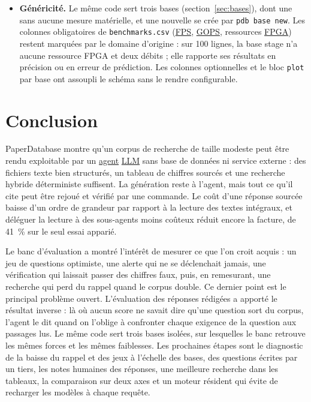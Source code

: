 \documentclass[11pt,a4paper]{article}
\newcommand{\cmd}[1]{\texttt{#1}}
\newcommand{\gl}[2]{\hyperlink{gl:#1}{\textcolor{glcolor}{#2}}}
\begin{document}
\begin{itemize}
    le moteur GPU, qui recharge ses modèles à chaque requête (3 à 4\,s).
  \item \textbf{Généricité.} Le même code sert trois bases (section~\ref{sec:bases}), dont une
    sans aucune mesure matérielle, et une nouvelle se crée par \cmd{pdb base new}. Les
    colonnes obligatoires de \cmd{benchmarks.csv} (\gl{FPS}{FPS}, \gl{GOPS}{GOPS}, ressources \gl{FPGA}{FPGA}) restent
    marquées par le domaine d'origine : sur 100 lignes, la base stage n'a aucune ressource FPGA et
    deux débits ; elle rapporte ses résultats en précision ou en erreur de prédiction. Les colonnes optionnelles et le bloc
    \cmd{plot} par base ont assoupli le schéma sans le rendre configurable.
\end{itemize}

\section{Conclusion}

PaperDatabase montre qu'un corpus de recherche de taille modeste peut être rendu
exploitable par un \gl{agent}{agent} \gl{LLM}{LLM} sans base de données ni service externe : des fichiers texte
bien structurés, un tableau de chiffres sourcés et une recherche hybride déterministe
suffisent. La génération reste à l'agent, mais tout ce qu'il cite peut être rejoué et
vérifié par une commande. Le coût d'une réponse sourcée baisse d'un ordre de grandeur par
rapport à la lecture des textes intégraux, et déléguer la lecture à des sous-agents moins
coûteux réduit encore la facture, de 41~\% sur le seul essai apparié.

Le banc d'évaluation a montré l'intérêt de mesurer ce que l'on croit acquis : un jeu de
questions optimiste, une alerte qui ne se déclenchait jamais, une vérification qui laissait
passer des chiffres faux, puis, en remesurant, une recherche qui perd du rappel quand le
corpus double. Ce dernier point est le principal problème ouvert. L'évaluation des réponses
rédigées a apporté le résultat inverse : là où aucun score ne savait dire qu'une question
sort du corpus, l'agent le dit quand on l'oblige à confronter chaque exigence de la question
aux passages lus. Le même code sert trois bases isolées, sur lesquelles le banc retrouve les
mêmes forces et les mêmes faiblesses. Les prochaines étapes sont le diagnostic de la baisse
du rappel et des jeux à l'échelle des bases, des questions écrites par un tiers, les notes
humaines des réponses, une meilleure recherche dans les tableaux, la comparaison sur deux
axes et un moteur résident qui évite de recharger les modèles à chaque requête.
\end{document}
